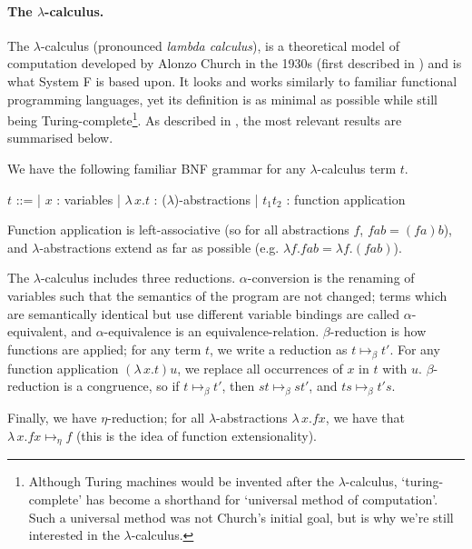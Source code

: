\documentclass[logo,bsc,singlespacing,parskip,online]{infthesis}
\begin{document}
\paragraph*{The $\lambda$-calculus.} The $\lambda$-calculus (pronounced
\textit{lambda calculus}), is a theoretical model of computation developed by
Alonzo Church in the 1930s (first described in \citet{church_set_1932}) and is
what System F is based upon. It looks and works similarly to familiar functional
programming languages, yet its definition is as minimal as possible while still
being Turing-complete\footnote{Although Turing machines would be invented after
the $\lambda$-calculus, `turing-complete' has become a shorthand for `universal
method of computation'. Such a universal method was not Church's initial goal,
but is why we're still interested in the $\lambda$-calculus.}. As described in
\cite{pierce_types_2002}, the most relevant results are summarised below.

We have the following familiar BNF grammar for any $\lambda$-calculus term $t$.

\begin{center}
\begin{bnf}
  $t$ ::=
  | $x$ : variables
  | $\lambda \, x. t$ : ($\lambda$)-abstractions
  | $t_1 t_2$ : function application
\end{bnf}
\end{center}

Function application is left-associative (so for all abstractions $f$, $f a b =
(f a) b$), and $\lambda$-abstractions extend as far as possible (e.g. $\lambda
f. f a b = \lambda f. (f a b)$).

The $\lambda$-calculus includes three reductions. $\alpha$-conversion is the
renaming of variables such that the semantics of the program are not changed;
terms which are semantically identical but use different variable bindings are
called $\alpha$-equivalent, and $\alpha$-equivalence is an equivalence-relation.
$\beta$-reduction is how functions are applied; for any term $t$, we write a
reduction as $t \mapsto_{\beta} t'$. For any function application $(\lambda \,
x. t) u$, we replace all occurrences of $x$ in $t$ with $u$. $\beta$-reduction
is a congruence, so if $t \mapsto_{\beta} t'$, then $st \mapsto_{\beta} st'$,
and $ts \mapsto_{\beta} t's$.

Finally, we have $\eta$-reduction; for all $\lambda$-abstractions $\lambda \, x.
f x$, we have that $\lambda \, x. f x \mapsto_{\eta} f$ (this is the idea of
function extensionality).
  
\end{document}
